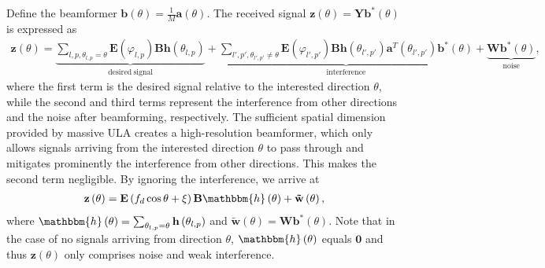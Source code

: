 \documentclass[12pt, draftclsnofoot, onecolumn]{IEEEtran}
\begin{document}
Define the beamformer $\mathbf{b}\left( \theta  \right) = \frac{1}{M} \mathbf{a}\left( \theta  \right) $. The received signal $\mathbf{z}\left( \theta  \right) = \mathbf{Y}{{\mathbf{b}}^{\text{*}}}\left( \theta  \right)$ is expressed as
\begin{align} \label{SIN}
\mathbf{z}\left( \theta  \right) = \underbrace{\sum\limits_{l,p, {{\theta }_{l,p}}
 =\theta }{\mathbf{E}\left( {{\varphi }_{l,p}} \right)\mathbf{Bh}\left( {{\theta }_{l,p}} \right)}}_{\mathrm{desired \ signal}} +\underbrace{\sum\limits_{l', p', {{\theta }_{l',p'}}\ne \theta }{\mathbf{E}\left( {{\varphi }_{l',p'}} \right)\mathbf{Bh}\left( {{\theta }_{l',p'}} \right){{\mathbf{a}}^{T}}\left( {{\theta }_{l', p'}} \right){{\mathbf{b}}^{\text{*}}}\left( \theta  \right)}}_{\mathrm{interference}} +\underbrace{\mathbf{W}{{\mathbf{b}}^{\text{*}}}\left( \theta  \right)}_{\mathrm{noise}},
\end{align}
where the first term is the desired signal relative to the interested direction $\theta$, while the second and third terms represent the interference from other directions and the noise after beamforming, respectively. The sufficient spatial dimension provided by massive ULA creates a high-resolution beamformer, which only allows signals arriving from the interested direction $\theta$ to pass through and mitigates prominently the interference from other directions. This makes the second term negligible. By ignoring the interference, we arrive at
\begin{align}
\mathbf{z}\left( \theta  \right) = \mathbf{E}\left( {{f}_{d}}\cos \theta +\xi  \right)\mathbf{B}\mathbbm{h} \left( \theta  \right)+\mathbf{\tilde{w}}\left( \theta \right),
\end{align}
where $\mathbbm{h}\left( \theta  \right)=\sum\nolimits_{{{\theta }_{l,p}}=\theta }{\mathbf{h}\left( {{\theta }_{l,p}} \right)}$
and $\mathbf{\tilde{w}}\left( \theta \right) =\mathbf{W}{{\mathbf{b}}^{\text{*}}}\left( \theta  \right)$.
Note that in the case of no signals arriving from direction $\theta$, $\mathbbm{h}\left( \theta  \right)$ equals $\mathbf{0}$ and thus $\mathbf{z}\left( \theta  \right)$ only comprises noise and weak interference.
\end{document}
